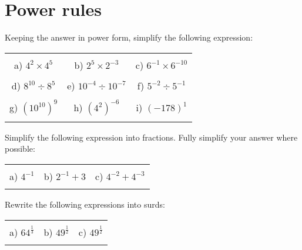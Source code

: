 \documentclass[12pt]{article}
\begin{document}
\section{Power rules}
Keeping the answer in power form, simplify the following expression:
\begin{table}[h!]
\centering
\begin{tabular}{c c c}
\hspace{5cm} & \hspace{5cm} & \hspace{5cm} \\
a) ${4}^{2}\times{4}^{5}$ & b) ${2}^{5}\times{2}^{-3}$ & c) ${6}^{-1}\times{6}^{-10}$ \\ \\
d) ${8}^{10}\div{8}^{5}$ & e) ${10}^{-4}\div{10}^{-7}$ & f) ${5}^{-2}\div{5}^{-1}$ \\ \\
g) $({10}^{10})^{9}$ & h) $({4}^{2})^{-6}$ & i) $({-178})^1$ \\ \\
\end{tabular}
\end{table}
\newline
Simplify the following expression into fractions. Fully simplify your answer where possible:
\begin{table}[h!]
\centering
\begin{tabular}{c c c}
\hspace{5cm} & \hspace{5cm} & \hspace{5cm} \\
a) ${4}^{-1}$ & b) ${2}^{-1} + {3}$ & c) ${4}^{-2} + {4}^{-3}$ \\ \\
\end{tabular}
\end{table}
\newline
Rewrite the following expressions into surds:
\begin{table}[h!]
\centering
\begin{tabular}{c c c}
\hspace{5cm} & \hspace{5cm} & \hspace{5cm} \\
a) ${64}^\frac{1}{{3}}$ & b) ${49}^\frac{1}{{2}}$ & c) ${49}^\frac{1}{{2}}$ \\ \\
\end{tabular}
\end{table}
\newline
\end{document}
